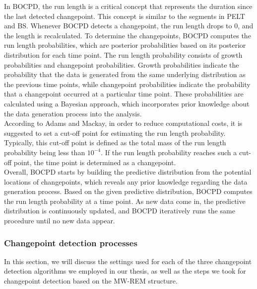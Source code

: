 \documentclass[]{interact}
\theoremstyle{plain}%
\theoremstyle{definition}
\theoremstyle{remark}
\begin{document}
	In BOCPD, the run length is a critical concept that represents the duration since the last detected changepoint. This concept is similar to the segments in PELT and BS. Whenever BOCPD detects a changepoint, the run length drops to 0, and the length is recalculated. To determine the changepoints, BOCPD computes the run length probabilities, which are posterior probabilities based on its posterior distribution for each time point. The run length probability consists of growth probabilities and changepoint probabilities. Growth probabilities indicate the probability that the data is generated from the same underlying distribution as the previous time points, while changepoint probabilities indicate the probability that a changepoint occurred at a particular time point. These probabilities are calculated using a Bayesian approach, which incorporates prior knowledge about the data generation process into the analysis. \\
	
	According to Adams and Mackay\cite{adamsBayesianOnlineChangepoint2007}, in order to reduce computational costs, it is suggested to set a cut-off point for estimating the run length probability. Typically, this cut-off point is defined as the total mass of the run length probability being less than $10^{-4}$. If the run length probability reaches such a cut-off point, the time point is determined as a changepoint. \\
	
	Overall, BOCPD starts by building the predictive distribution from the potential locations of changepoints, which reveals any prior knowledge regarding the data generation process. Based on the given predictive distribution, BOCPD computes the run length probability at a time point. As new data come in, the predictive distribution is continuously updated, and BOCPD iteratively runs the same procedure until no new data appear.
	
	\subsubsection{Changepoint detection processes} \label{sec:our method}
	
	\hspace{0.27cm} In this section, we will discuss the settings used for each of the three changepoint detection algorithms we employed in our thesis, as well as the steps we took for changepoint detection based on the MW-REM structure. \\
	
\end{document}
